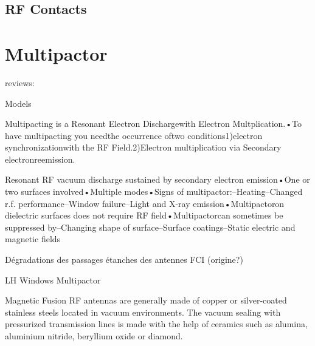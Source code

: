 \subsection{RF Contacts}\label{sec:RF_contacts}




\section{Multipactor}\label{sec:Multipactor}
reviews:\cite{kishek1998}

Models\cite{vaughan1989}

Multipacting is a Resonant Electron Dischargewith Electron Multplication.•To have multipacting you needthe occurrence oftwo conditions1)electron synchronizationwith the RF Field.2)Electron multiplication via Secondary electronreemission.

Resonant RF vacuum discharge sustained by secondary electron emission•One or two surfaces involved•Multiple modes•Signs of multipactor:–Heating–Changed r.f. performance–Window failure–Light and X-ray emission•Multipactoron dielectric surfaces does not require RF field•Multipactorcan sometimes be suppressed by–Changing shape of surface–Surface coatings–Static electric and magnetic fields

Dégradations des passages étanches des antennes FCI (origine?)



LH Windows Multipactor



Magnetic Fusion RF antennas are generally made of copper or silver-coated stainless steels located in vacuum environments. The vacuum sealing with pressurized transmission lines is made with the help of ceramics such as alumina, aluminium nitride, beryllium oxide or diamond. 

